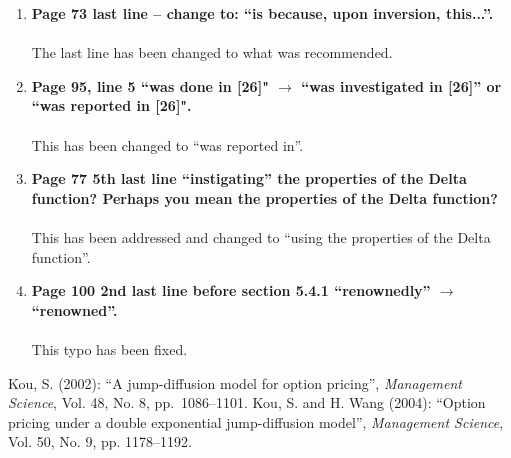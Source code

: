 \documentclass{article}
\begin{document}
\begin{enumerate}
         \item \textbf{Page 73 last line -- change to: ``is because, upon inversion, this...''.
    \\
    \\}
    The last line has been changed to what was recommended.
    
         \item \textbf{Page 95, line 5 ``was done in [26]" $\rightarrow$ ``was investigated in [26]'' or ``was reported in [26]".
    \\
    \\}
    This has been changed to ``was reported in''.
    
         \item \textbf{Page 77 5th last line ``instigating'' the properties of the Delta function? Perhaps you mean the properties of the Delta function?
    \\
    \\}
    This has been addressed and changed to ``using the properties of the Delta function''.
    
         \item \textbf{Page 100 2nd last line before section 5.4.1 ``renownedly'' $\rightarrow$ ``renowned''.
    \\
    \\}
    This typo has been fixed.    

\end{enumerate}

\begin{thebibliography}{100}
 Kou, S. (2002): ``A jump-diffusion model for option pricing'', \emph{Management Science}, Vol. 48, No. 8, pp.~1086--1101.
	 Kou, S. and H. Wang (2004): ``Option pricing under a double exponential jump-diffusion model'', \emph{Management Science}, Vol. 50, No. 9, pp. 1178--1192.

\end{thebibliography}
\end{document}
